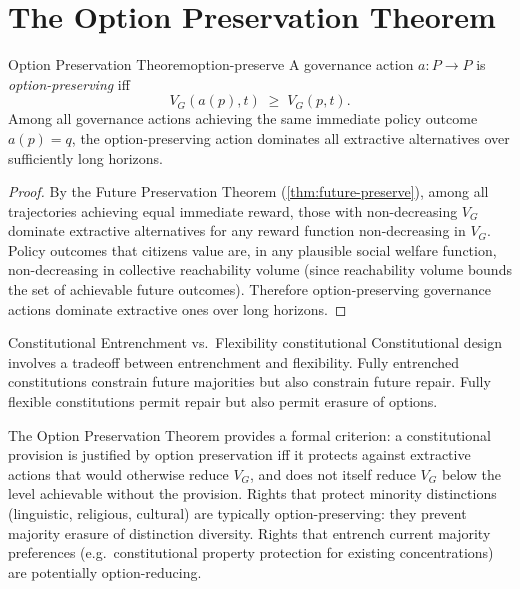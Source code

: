 \documentclass[12pt,twoside,openright]{book}
\begin{document}
\section{The Option Preservation Theorem}

\begin{theorem}{Option Preservation Theorem}{option-preserve}
  A governance action $a: P \to P$ is \emph{option-preserving}
  iff
  \[
    V_G(a(p), t) \;\ge\; V_G(p, t).
  \]
  Among all governance actions achieving the same
  immediate policy outcome $a(p) = q$, the
  option-preserving action dominates all extractive
  alternatives over sufficiently long horizons.
\end{theorem}

\begin{proof}
  By the Future Preservation Theorem
  (\cref{thm:future-preserve}), among all trajectories
  achieving equal immediate reward, those with
  non-decreasing $V_G$ dominate extractive alternatives
  for any reward function non-decreasing in $V_G$.
  Policy outcomes that citizens value are, in any
  plausible social welfare function, non-decreasing
  in collective reachability volume (since reachability
  volume bounds the set of achievable future outcomes).
  Therefore option-preserving governance actions
  dominate extractive ones over long horizons.
\end{proof}

\begin{example}{Constitutional Entrenchment vs.\ Flexibility}%
  {constitutional}
  Constitutional design involves a tradeoff between
  entrenchment and flexibility.
  Fully entrenched constitutions constrain future
  majorities but also constrain future repair.
  Fully flexible constitutions permit repair but also
  permit erasure of options.

  The Option Preservation Theorem provides a formal
  criterion: a constitutional provision is justified
  by option preservation iff it protects against
  extractive actions that would otherwise reduce $V_G$,
  and does not itself reduce $V_G$ below the level
  achievable without the provision.
  Rights that protect minority distinctions (linguistic,
  religious, cultural) are typically option-preserving:
  they prevent majority erasure of distinction diversity.
  Rights that entrench current majority preferences
  (e.g.\ constitutional property protection for
  existing concentrations) are potentially option-reducing.
\end{example}
\end{document}
